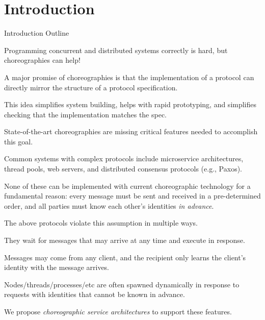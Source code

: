 \maketitle

\section{Introduction}
\label{sec:intro}

\begin{outline}{Introduction Outline}
  \item Programming concurrent and distributed systems correctly is hard, but choreographies can help!
    \begin{lvl}
      \item A major promise of choreographies is that the implementation of a protocol
        can directly mirror the structure of a protocol specification.
      \item This idea simplifies system building, helps with rapid prototyping, and simplifies checking that the implementation matches the spec.
    \end{lvl}

    \item State-of-the-art choreographies are missing critical features needed to accomplish this goal.
    \begin{lvl}
      \item Common systems with complex protocols include
        microservice architectures, thread pools, web servers, and distributed consensus protocols (e.g., Paxos).
      \item None of these can be implemented with current choreographic technology for a fundamental reason:
        every message must be sent and received in a pre-determined order,
        and all parties must know each other's identities \emph{in advance}.
      \item The above protocols violate this assumption in multiple ways.
        \begin{lvl}
          \item They wait for messages that may arrive at any time and execute in response.
          \item Messages may come from any client, and the recipient only learns the client's identity with the message arrives.
          \item Nodes/threads/processes/etc are often spawned dynamically in response to requests
            with identities that cannot be known in advance.
        \end{lvl}
    \end{lvl}

  \item We propose \emph{choreographic service architectures} to support these features.
    \begin{lvl}
      \item
    \end{lvl}
\end{outline}
